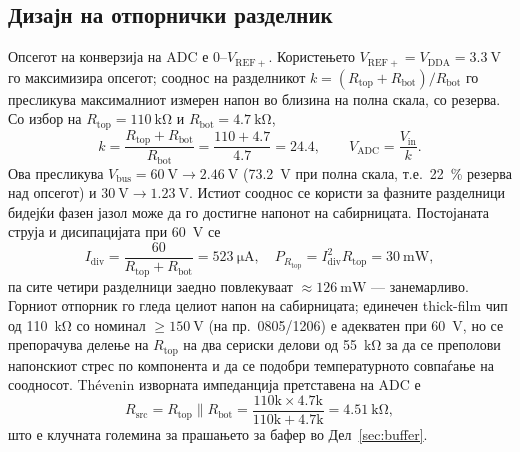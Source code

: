 \documentclass[journal,onecolumn,11pt]{IEEEtran}
\newcommand{\Vdcbus}{V_{\mathrm{bus}}}
\begin{document}
\subsection{Дизајн на отпорнички разделник}\label{sec:divider}
Опсегот на конверзија на ADC е $0$--$V_{\mathrm{REF+}}$. Користењето
$V_{\mathrm{REF+}}=V_{\mathrm{DDA}}=\SI{3.3}{\volt}$ го максимизира опсегот; сооднос
на разделникот $k=(R_{\mathrm{top}}+R_{\mathrm{bot}})/R_{\mathrm{bot}}$ го пресликува
максималниот измерен напон во близина на полна скала, со резерва. Со избор на
$R_{\mathrm{top}}=\SI{110}{\kilo\ohm}$ и $R_{\mathrm{bot}}=\SI{4.7}{\kilo\ohm}$,
\begin{equation}
k=\frac{R_{\mathrm{top}}+R_{\mathrm{bot}}}{R_{\mathrm{bot}}}
 =\frac{110+4.7}{4.7}=24.4,\qquad V_{\mathrm{ADC}}=\frac{V_{\mathrm{in}}}{k}.
\end{equation}
Ова пресликува $\Vdcbus=\SI{60}{\volt}\to\SI{2.46}{\volt}$ (\SI{73.2}{\volt} при
полна скала, т.е.\ \SI{22}{\percent} резерва над опсегот) и
$\SI{30}{\volt}\to\SI{1.23}{\volt}$. Истиот сооднос се користи за фазните разделници
бидејќи фазен јазол може да го достигне напонот на сабирницата. Постојаната струја и
дисипацијата при \SI{60}{\volt} се
\begin{equation}
I_{\mathrm{div}}=\frac{60}{R_{\mathrm{top}}+R_{\mathrm{bot}}}=\SI{523}{\micro\ampere},\quad
P_{R_{\mathrm{top}}}=I_{\mathrm{div}}^2R_{\mathrm{top}}=\SI{30}{\milli\watt},
\end{equation}
па сите четири разделници заедно повлекуваат $\approx\SI{126}{\milli\watt}$ ---
занемарливо. Горниот отпорник го гледа целиот напон на сабирницата; единечен
thick-film чип од \SI{110}{\kilo\ohm} со номинал $\ge\SI{150}{\volt}$ (на пр.\
0805/1206) е адекватен при \SI{60}{\volt}, но се препорачува делење на
$R_{\mathrm{top}}$ на два сериски делови од \SI{55}{\kilo\ohm} за да се преполови
напонскиот стрес по компонента и да се подобри температурното совпаѓање на соодносот.
Th\'evenin изворната импеданција претставена на ADC е
\begin{equation}
R_{\mathrm{src}}=R_{\mathrm{top}}\parallel R_{\mathrm{bot}}
   =\frac{110\text{k}\times4.7\text{k}}{110\text{k}+4.7\text{k}}=\SI{4.51}{\kilo\ohm},
\label{eq:rsrc}
\end{equation}
што е клучната големина за прашањето за бафер во Дел~\ref{sec:buffer}.
\end{document}
